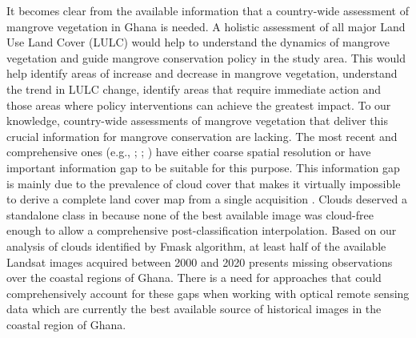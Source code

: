\documentclass[12pt,oneside,preprint,3p,authoryear,times]{elsarticle} %
\begin{document}
It becomes clear from the available information that a country-wide
assessment of mangrove vegetation in Ghana is needed. A holistic
assessment of all major Land Use Land Cover (LULC) would help to
understand the dynamics of mangrove vegetation and guide mangrove
conservation policy in the study area. This would help identify areas of
increase and decrease in mangrove vegetation, understand the trend in
LULC change, identify areas that require immediate action and those
areas where policy interventions can achieve the greatest impact. To our
knowledge, country-wide assessments of mangrove vegetation that deliver
this crucial information for mangrove conservation are lacking. The most
recent and comprehensive ones (e.g., \citet{CILSS-2016};
\citet{Spalding-et-al-1997}; \citet{Spalding-et-al-2010}) have either
coarse spatial resolution or have important information gap to be
suitable for this purpose. This information gap is mainly due to the
prevalence of cloud cover \citep{Ashiagbor-et-al-2021} that makes it
virtually impossible to derive a complete land cover map from a single
acquisition \citep{Rubin-et-al-1999}. Clouds deserved a standalone class
in \citet{CILSS-2016} because none of the best available image was
cloud-free enough to allow a comprehensive post-classification
interpolation. Based on our analysis of clouds identified by Fmask
algorithm, at least half of the available Landsat images acquired
between 2000 and 2020 presents missing observations over the coastal
regions of Ghana. There is a need for approaches that could
comprehensively account for these gaps when working with optical remote
sensing data which are currently the best available source of historical
images in the coastal region of Ghana.
\end{document}
